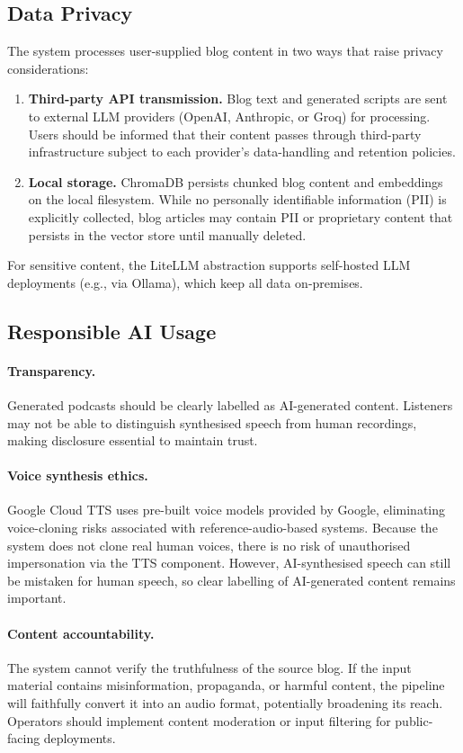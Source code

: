 \documentclass[sigconf,natbib=false]{acmart}   %
\begin{document}
\subsection{Data Privacy}
The system processes user-supplied blog content in two ways that raise privacy considerations:
\begin{enumerate}[nosep]
  \item \textbf{Third-party API transmission.}  Blog text and generated scripts are sent to external LLM providers (OpenAI, Anthropic, or Groq) for processing.  Users should be informed that their content passes through third-party infrastructure subject to each provider's data-handling and retention policies.
  \item \textbf{Local storage.}  ChromaDB persists chunked blog content and embeddings on the local filesystem.  While no personally identifiable information (PII) is explicitly collected, blog articles may contain PII or proprietary content that persists in the vector store until manually deleted.
\end{enumerate}
For sensitive content, the LiteLLM abstraction supports self-hosted LLM deployments (e.g., via Ollama), which keep all data on-premises.

\subsection{Responsible AI Usage}
\paragraph{Transparency.}  Generated podcasts should be clearly labelled as AI-generated content.  Listeners may not be able to distinguish synthesised speech from human recordings, making disclosure essential to maintain trust.

\paragraph{Voice synthesis ethics.}  Google Cloud TTS uses pre-built voice models provided by Google, eliminating voice-cloning risks associated with reference-audio-based systems.  Because the system does not clone real human voices, there is no risk of unauthorised impersonation via the TTS component.  However, AI-synthesised speech can still be mistaken for human speech, so clear labelling of AI-generated content remains important.

\paragraph{Content accountability.}  The system cannot verify the truthfulness of the source blog.  If the input material contains misinformation, propaganda, or harmful content, the pipeline will faithfully convert it into an audio format, potentially broadening its reach.  Operators should implement content moderation or input filtering for public-facing deployments.
\end{document}
